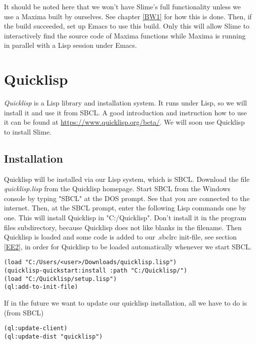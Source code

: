 \documentclass[../Maxima_Workbook.tex]{subfiles}
\begin{document}
\lz It should be noted here that we won't have Slime's full functionality unless we use a Maxima built by ourselves. See chapter \ref{BW1} for how this is done. Then, if the build succeeded, set up Emacs to use this build. Only this will allow Slime to interactively find the source code of Maxima functions while Maxima is running in parallel with a Lisp session under Emacs.

\section{Quicklisp}

\emph{Quicklisp} is a Lisp library and installation system. It runs under Lisp, so we will install it and use it from SBCL. A good introduction and instruction how to use it can be found at \href{https://www.quicklisp.org/beta/}{https://www.quicklisp.org/beta/}. We will soon use Quicklisp to install Slime.

\subsection{Installation}

Quicklisp will be installed via our Lisp system, which is SBCL. Download the file \emph{quicklisp.lisp} from the Quicklisp homepage. Start SBCL from the Windows console by typing "SBCL" at the DOS prompt. See that you are connected to the internet. Then, at the SBCL prompt, enter the following Lisp commands one by one. This will install Quicklisp in "C:/Quicklisp". Don't install it in the program files subdirectory, because Quicklisp does not like blanks in the filename. Then Quicklisp is loaded and some code is added to our .sbclrc init-file, see section \ref{EE2}, in order for Quicklisp to be loaded automatically whenever we start SBCL.

\begin{lstlisting}[style=lisp]
(load "C:/Users/<user>/Downloads/quicklisp.lisp")
(quicklisp-quickstart:install :path "C:/Quicklisp/")
(load "C:/Quicklisp/setup.lisp")
(ql:add-to-init-file)
\end{lstlisting}

If in the future we want to update our quicklisp installation, all we have to do is (from SBCL)

\begin{lstlisting}[style=lisp]
(ql:update-client)
(ql:update-dist "quicklisp")
\end{lstlisting}
\end{document}
